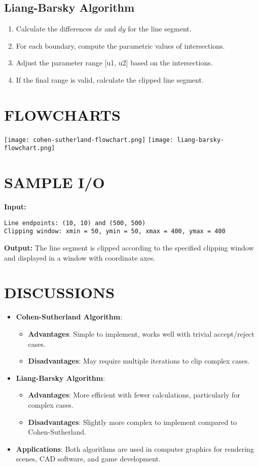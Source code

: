 \documentclass{article}
\begin{document}
\subsection*{Liang-Barsky Algorithm}
\begin{enumerate}
    \item Calculate the differences \(dx\) and \(dy\) for the line segment.
    \item For each boundary, compute the parametric values of intersections.
    \item Adjust the parameter range [u1, u2] based on the intersections.
    \item If the final range is valid, calculate the clipped line segment.
\end{enumerate}

\section*{FLOWCHARTS}
\begin{center}
\texttt{[image: cohen-sutherland-flowchart.png]}
\texttt{[image: liang-barsky-flowchart.png]}
\end{center}

\section*{SAMPLE I/O}
\textbf{Input:}
\begin{verbatim}
Line endpoints: (10, 10) and (500, 500)
Clipping window: xmin = 50, ymin = 50, xmax = 400, ymax = 400
\end{verbatim}

\textbf{Output:}
The line segment is clipped according to the specified clipping window and displayed in a window with coordinate axes.

\section*{DISCUSSIONS}
\begin{itemize}
    \item \textbf{Cohen-Sutherland Algorithm}: 
    \begin{itemize}
        \item \textbf{Advantages}: Simple to implement, works well with trivial accept/reject cases.
        \item \textbf{Disadvantages}: May require multiple iterations to clip complex cases.
    \end{itemize}
    \item \textbf{Liang-Barsky Algorithm}:
    \begin{itemize}
        \item \textbf{Advantages}: More efficient with fewer calculations, particularly for complex cases.
        \item \textbf{Disadvantages}: Slightly more complex to implement compared to Cohen-Sutherland.
    \end{itemize}
    \item \textbf{Applications}: Both algorithms are used in computer graphics for rendering scenes, CAD software, and game development.
\end{itemize}
\end{document}
